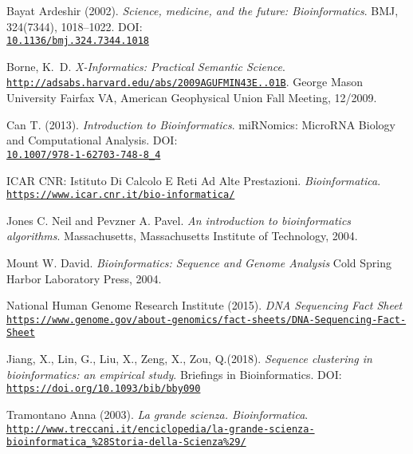 \documentclass[twoside,openright,titlepage,fleqn,
,	headinclude,12pt,a4paper,BCOR5mm,footinclude,table]{scrbook}
\begin{document}
\begin{thebibliography}{50}
Bayat Ardeshir (2002).
\textit{Science, medicine, and the future: Bioinformatics}.
BMJ, 324(7344), 1018–1022.
DOI: \\\texttt{\url{10.1136/bmj.324.7344.1018}}

Borne, K.~D.
\textit{X-Informatics: Practical Semantic Science}.
\\\texttt{\url{http://adsabs.harvard.edu/abs/2009AGUFMIN43E..01B}}.
George Mason University Fairfax VA, American Geophysical Union Fall Meeting, 12/2009.

Can T. (2013).
\textit{Introduction to Bioinformatics}.
miRNomics: MicroRNA Biology and Computational Analysis.
DOI: \\\texttt{\url{10.1007/978-1-62703-748-8_4}}

ICAR CNR: Istituto Di Calcolo E Reti Ad Alte Prestazioni.
\textit{Bioinformatica}.
\\\texttt{\url{https://www.icar.cnr.it/bio-informatica/}}

Jones C. Neil and Pevzner A. Pavel.
\textit{An introduction to bioinformatics algorithms}.
Massachusetts, Massachusetts Institute of Technology, 2004.

Mount W. David.
\textit{Bioinformatics: Sequence and Genome Analysis}
Cold Spring Harbor Laboratory Press, 2004.

National Human Genome Research Institute (2015).
\textit{DNA Sequencing Fact Sheet}
\\\texttt{\url{https://www.genome.gov/about-genomics/fact-sheets/DNA-Sequencing-Fact-Sheet}}

Jiang, X., Lin, G., Liu, X., Zeng, X., Zou, Q.(2018).
\textit{Sequence clustering in bioinformatics: an empirical study}.
Briefings in Bioinformatics.
DOI: \\\texttt{\url{https://doi.org/10.1093/bib/bby090}}

Tramontano Anna (2003).
\textit{La grande scienza. Bioinformatica}.
\\\texttt{\url{http://www.treccani.it/enciclopedia/la-grande-scienza-bioinformatica_\%28Storia-della-Scienza\%29/}}


\end{thebibliography}


\end{document}
